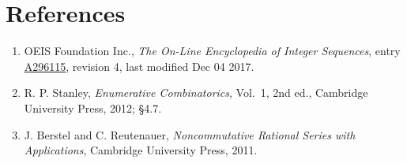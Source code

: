 \documentclass[11pt]{article}
\theoremstyle{definition}
\begin{document}
\section{References}

\begin{enumerate}

\item OEIS Foundation Inc., \emph{The On-Line Encyclopedia of Integer Sequences}, entry \href{https://oeis.org/A296115}{A296115}, revision 4, last modified Dec 04 2017.

\item R. P. Stanley, \emph{Enumerative Combinatorics}, Vol.~1, 2nd ed., Cambridge University Press, 2012; \S4.7.

\item J. Berstel and C. Reutenauer, \emph{Noncommutative Rational Series with Applications}, Cambridge University Press, 2011.

\end{enumerate}
\end{document}
